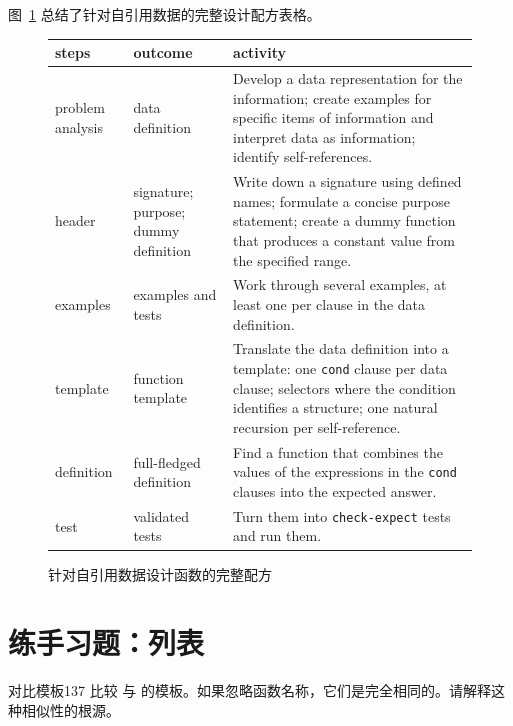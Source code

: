 图~\ref{fig:design_recipe_self_referential} 总结了针对自引用数据的完整设计配方表格。

\begin{figure}[htbp]
  \centering
  \footnotesize
  \setlength{\tabcolsep}{3.5pt}
  \begin{tabular}{@{}>{\raggedright\arraybackslash}p{}>{\raggedright\arraybackslash}p{}>{\raggedright\arraybackslash}p{}@{}}
    \toprule
    \textbf{steps} & \textbf{outcome} & \textbf{activity} \\
    \midrule
    problem analysis & data definition &
    Develop a data representation for the information; create examples for specific items of information and interpret data as information; identify self-references. \\
    \addlinespace[4pt]
    header & signature; purpose; dummy definition &
    Write down a signature using defined names; formulate a concise purpose statement; create a dummy function that produces a constant value from the specified range. \\
    \addlinespace[4pt]
    examples & examples and tests &
    Work through several examples, at least one per clause in the data definition. \\
    \addlinespace[4pt]
    template & function template &
    Translate the data definition into a template: one \texttt{cond} clause per data clause; selectors where the condition identifies a structure; one natural recursion per self-reference. \\
    \addlinespace[4pt]
    definition & full-fledged definition &
    Find a function that combines the values of the expressions in the \texttt{cond} clauses into the expected answer. \\
    \addlinespace[4pt]
    test & validated tests &
    Turn them into \texttt{check-expect} tests and run them. \\
    \bottomrule
  \end{tabular}
  \caption{针对自引用数据设计函数的完整配方}
  \label{fig:design_recipe_self_referential}
\end{figure}

\section{练手习题：列表}
\label{sec:ch09_finger_exercises_lists}

\begin{exercise}{对比模板}{137}
比较  与  的模板。如果忽略函数名称，它们是完全相同的。请解释这种相似性的根源。
\end{exercise}

